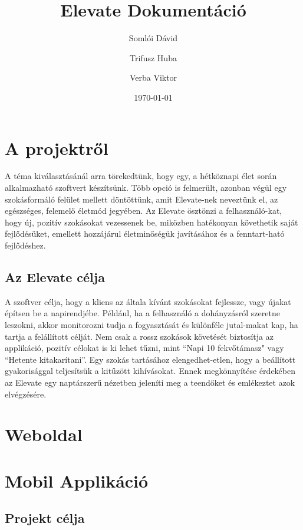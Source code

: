 \documentclass[12pt]{report}
\begin{document}
\title{Elevate Dokumentáció}
\author{Somlói Dávid
        \and
        Trifusz Huba
        \and
        Verba Viktor}
\date{\today}

\maketitle

\setcounter{tocdepth}{3}
\tableofcontents

\chapter{A projektről}
\begin{sloppypar}
A téma kiválasztásánál arra törekedtünk, hogy egy, a hétköznapi élet során alkalmazható szoftvert készítsünk. Több opció is felmerült, azonban végül egy szokásformáló felület mellett döntöttünk, amit Elevate-nek neveztünk el, az egészséges, felemelő életmód jegyében. Az Elevate ösztönzi a felhasználó-kat, hogy új, pozitív szokásokat vezessenek be, miközben hatékonyan követhetik saját fejlődésüket, emellett hozzájárul életminőségük javításához és a fenntart-ható fejlődéshez.
\end{sloppypar}
\section{Az Elevate célja}
\begin{sloppypar}
A szoftver célja, hogy a kliens az általa kívánt szokásokat fejlessze, vagy újakat építsen be a napirendjébe. Például, ha a felhasználó a dohányzásról szeretne leszokni, akkor monitorozni tudja a fogyasztását és különféle jutal-makat kap, ha tartja a felállított célját. Nem csak a rossz szokások követését biztosítja az applikáció, pozitív célokat is ki lehet tűzni, mint “Napi 10 fekvőtámasz" vagy “Hetente kitakarítani”. Egy szokás tartásához elengedhet-etlen, hogy a beállított gyakorisággal teljesítsük a kitűzött kihívásokat. Ennek megkönnyítése érdekében az Elevate egy naptárszerű nézetben jeleníti meg a teendőket és emlékeztet azok elvégzésére. 
\end{sloppypar}
\chapter{Weboldal}
\chapter{Mobil Applikáció}
\section{Projekt célja}
\end{document}
